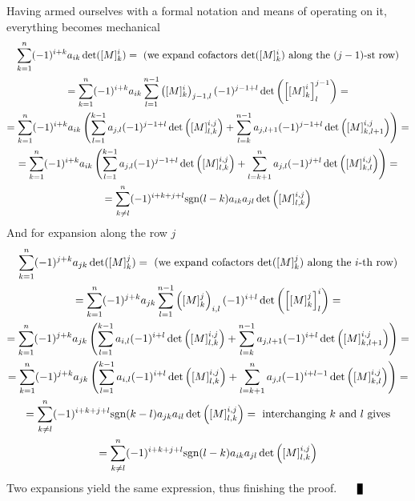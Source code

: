 \documentclass[8pt]{article} %
\begin{document}
Having armed ourselves with a formal notation and means of operating on it, everything becomes mechanical
\newcommand{\sgn}{\mbox{sgn}}
\begin{gather*}
	\sum_{k=1}^n(-1)^{i+k}a_{ik}\det([M]_k^i)=\mbox{ (we expand cofactors $\det([M]_k^i)$ along the $(j-1)$-st row)}\\
	=\sum_{k=1}^n(-1)^{i+k}a_{ik}\sum_{l=1}^{n-1}\mybra{[M]_k^i}_{j-1,l}(-1)^{j-1+l}\det\mybra{\mysbra{\mysbra{M}_k^i}_l^{j-1}}=\\
	=\sum_{k=1}^n(-1)^{i+k}a_{ik}\left(
		\sum_{l=1}^{k-1}a_{j,l}(-1)^{j-1+l}\det\mybra{\mysbra{M}^{i,j}_{l,k}}+
		\sum_{l=k}^{n-1}a_{j,l+1}(-1)^{j-1+l}\det\mybra{\mysbra{M}^{i,j}_{k,l+1}}
	\right)=\\
	=\sum_{k=1}^n(-1)^{i+k}a_{ik}\left(
		\sum_{l=1}^{k-1}a_{j,l}(-1)^{j-1+l}\det\mybra{\mysbra{M}^{i,j}_{l,k}}+
		\sum_{l=k+1}^{n}a_{j,l}(-1)^{j+l}\det\mybra{\mysbra{M}^{i,j}_{k,l}}
	\right)=\\
	=\sum_{{\begin{subarray}{c}\\k\neq l\end{subarray}}
	}^n(-1)^{i+k+j+l}\sgn(l-k)a_{ik}a_{jl}\det\mybra{\mysbra{M}^{i,j}_{l,k}}
\end{gather*}
And for expansion along the row $j$
\begin{gather*}
	\sum_{k=1}^n(-1)^{j+k}a_{jk}\det([M]_k^j)=\mbox{ (we expand cofactors $\det([M]_k^j)$ along the $i$-th row)}\\
	=\sum_{k=1}^n(-1)^{j+k}a_{jk}\sum_{l=1}^{n-1}\mybra{[M]_k^j}_{i,l}(-1)^{i+l}\det\mybra{\mysbra{\mysbra{M}_k^j}_l^i}=\\
	=\sum_{k=1}^n(-1)^{j+k}a_{jk}\left(
		\sum_{l=1}^{k-1}a_{i,l}(-1)^{i+l}\det\mybra{\mysbra{M}^{i,j}_{l,k}}+
		\sum_{l=k}^{n-1}a_{j,l+1}(-1)^{i+l}\det\mybra{\mysbra{M}^{i,j}_{k,l+1}}
	\right)=\\
	=\sum_{k=1}^n(-1)^{j+k}a_{jk}\left(
		\sum_{l=1}^{k-1}a_{i,l}(-1)^{i+l}\det\mybra{\mysbra{M}^{i,j}_{l,k}}+
		\sum_{l=k+1}^{n}a_{j,l}(-1)^{i+l-1}\det\mybra{\mysbra{M}^{i,j}_{k,l}}
	\right)=\\
	=\sum_{{\begin{subarray}{c}\\k\neq l\end{subarray}}
		}^n(-1)^{i+k+j+l}\sgn(k-l)a_{jk}a_{il}\det\mybra{\mysbra{M}^{i,j}_{l,k}}=\mbox{ interchanging $k$ and $l$ gives}\\
	=\sum_{{\begin{subarray}{c}\\k\neq l\end{subarray}}
	}^n(-1)^{i+k+j+l}\sgn(l-k)a_{ik}a_{jl}\det\mybra{\mysbra{M}^{i,j}_{l,k}}
\end{gather*}
Two expansions yield the same expression, thus finishing the proof. $\myqed$
\end{document}
